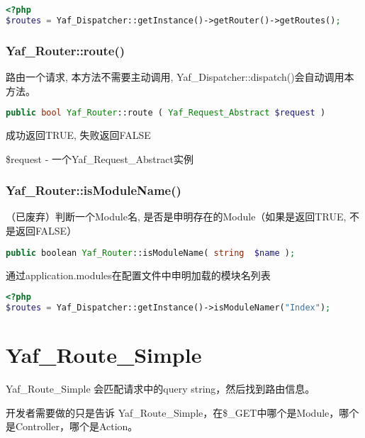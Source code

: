 \begin{lstlisting}[language=PHP]
<?php
$routes = Yaf_Dispatcher::getInstance()->getRouter()->getRoutes();
\end{lstlisting}

\subsection{Yaf\_Router::route()}

路由一个请求, 本方法不需要主动调用, Yaf\_Dispatcher::dispatch()会自动调用本方法。

\begin{lstlisting}[language=PHP]
public bool Yaf_Router::route ( Yaf_Request_Abstract $request )
\end{lstlisting}

成功返回TRUE, 失败返回FALSE

\begin{compactitem}
\item \$request - 一个Yaf\_Request\_Abstract实例
\end{compactitem}




\subsection{Yaf\_Router::isModuleName()}

（已废弃）判断一个Module名, 是否是申明存在的Module（如果是返回TRUE, 不是返回FALSE）

\begin{lstlisting}[language=PHP]
public boolean Yaf_Router::isModuleName( string  $name );
\end{lstlisting}

通过application.modules在配置文件中申明加载的模块名列表


\begin{lstlisting}[language=PHP]
<?php
$routes = Yaf_Dispatcher::getInstance()->isModuleNamer("Index");
\end{lstlisting}

\chapter{Yaf\_Route\_Simple}


Yaf\_Route\_Simple 会匹配请求中的query string，然后找到路由信息。

开发者需要做的只是告诉 Yaf\_Route\_Simple，在\$\_GET中哪个是Module，哪个是Controller，哪个是Action。


